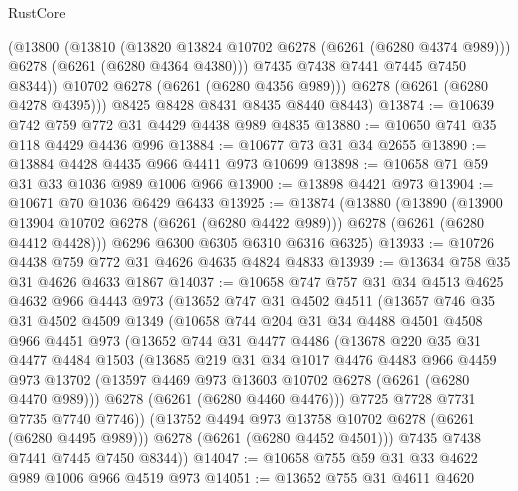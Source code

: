 \begin{lexlean}{RustCore}
\begin{coremodule}
            (@13800
              (@13810
                (@13820 @13824 @10702 @6278 (@6261 (@6280 @4374 @989)))
                @6278
                (@6261 (@6280 @4364 @4380)))
              @7435
              @7438
              @7441
              @7445
              @7450
              @8344))
          @10702
          @6278
          (@6261 (@6280 @4356 @989)))
        @6278
        (@6261 (@6280 @4278 @4395)))
      @8425
      @8428
      @8431
      @8435
      @8440
      @8443)
@13874 := @10639 @742 @759 @772 @31 @4429 @4438 @989 @4835
@13880 := @10650 @741 @35 @118 @4429 @4436 @996
@13884 := @10677 @73 @31 @34 @2655
@13890 := @13884 @4428 @4435 @966 @4411 @973 @10699
@13898 := @10658 @71 @59 @31 @33 @1036 @989 @1006 @966
@13900 := @13898 @4421 @973
@13904 := @10671 @70 @1036 @6429 @6433
@13925 := @13874
    (@13880
      (@13890
        (@13900 @13904 @10702 @6278 (@6261 (@6280 @4422 @989)))
        @6278
        (@6261 (@6280 @4412 @4428)))
      @6296
      @6300
      @6305
      @6310
      @6316
      @6325)
@13933 := @10726 @4438 @759 @772 @31 @4626 @4635 @4824 @4833
@13939 := @13634 @758 @35 @31 @4626 @4633 @1867
@14037 := @10658
    @747
    @757
    @31
    @34
    @4513
    @4625
    @4632
    @966
    @4443
    @973
    (@13652
      @747
      @31
      @4502
      @4511
      (@13657
        @746
        @35
        @31
        @4502
        @4509
        @1349
        (@10658
          @744
          @204
          @31
          @34
          @4488
          @4501
          @4508
          @966
          @4451
          @973
          (@13652
            @744
            @31
            @4477
            @4486
            (@13678
              @220
              @35
              @31
              @4477
              @4484
              @1503
              (@13685
                @219
                @31
                @34
                @1017
                @4476
                @4483
                @966
                @4459
                @973
                @13702
                (@13597 @4469 @973 @13603 @10702 @6278 (@6261 (@6280 @4470 @989)))
                @6278
                (@6261 (@6280 @4460 @4476)))
              @7725
              @7728
              @7731
              @7735
              @7740
              @7746))
          (@13752 @4494 @973 @13758 @10702 @6278 (@6261 (@6280 @4495 @989)))
          @6278
          (@6261 (@6280 @4452 @4501)))
        @7435
        @7438
        @7441
        @7445
        @7450
        @8344))
@14047 := @10658 @755 @59 @31 @33 @4622 @989 @1006 @966 @4519 @973
@14051 := @13652 @755 @31 @4611 @4620

\end{coremodule}
\end{lexlean}
